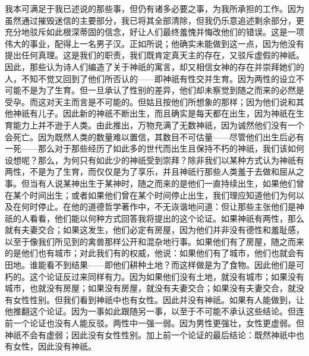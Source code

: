 我本可满足于我已述说的那些事，但仍有诸多必要之事，为我所承担的工作。因为虽然通过摧毁迷信的主要部分，我已将其全部清除，但我仍乐意追述剩余部分，更充分地驳斥如此根深蒂固的信念，好让人们最终羞愧并悔改他们的错误。这是一项伟大的事业，配得上一名男子汉。正如所说；他确实未能做到这一点，因为他没有提出任何真理。这是我们的职责，我们既肯定真天主的存在，又驳斥虚假的神祇。因此，那些认为诗人们编造了关于神祇的寓言，却又相信女神的存在并崇拜她们的人，不知不觉又回到了他们所否认的——即神祇有性交并生育。因为两性的设立不可能不是为了生育。但一旦承认了性别的差异，他们却未察觉到随之而来的必然是受孕。而这对天主而言是不可能的。但姑且按他们所想象的那样；因为他们说和其他神祇有儿子。因此新的神祇不断出生，而且确实是每天都在出生，因为神祇在生育能力上并不逊于人类。由此推出，万物充满了无数神祇，因为诚然他们没有一个会死亡。因为既然人类的数量难以置信，其数目不可估量——尽管他们出生后必有一死——那么对于那些经历了如此多的世代而出生且保持不朽的神祇，我们该如何设想呢？那么，为何只有如此少的神祇受到崇拜？除非我们以某种方式认为神祇有两性，不是为了生育，而仅仅是为了享乐，并且神祇行那些人类羞于去做和屈从之事。但当有人说某神出生于某神时，随之而来的是他们一直持续出生，如果他们曾在某个时间出生；或者如果他们曾在某个时间停止出生，我们理应知道他们为何以及在何时停止。在他的道德哲学著作中，不无诙谐地问道：但让那些主张他们是神祇的人看看，他们能以何种方式回答我将提出的这个论证。如果神祇有两性，那么就有夫妻交合；如果这发生，他们必定有房屋，因为他们并非没有德性和羞耻感，以至于像我们所见到的禽兽那样公开和混杂地行事。如果他们有了房屋，随之而来的是他们也有城市；对此我们有的权威，他说：如果他们有了城市，他们也就会有田地。谁能看不到结果——即他们耕种土地？而这样做是为了食物。因此他们是可朽的。这个论证反过来同样有力。因为如果他们没有土地，就没有城市；如果没有城市，也就没有房屋；如果没有房屋，就没有夫妻交合；如果没有夫妻交合，就没有女性性别。但我们看到神祇中也有女性。因此并没有神祇。如果有人能做到，让他推翻这个论证。因为一事如此跟随另一事，以至于不可能不承认这些结论。但连前一个论证也没有人能反驳。两性中一强一弱。因为男性更强壮，女性更虚弱。但神祇不会有虚弱；因此没有女性性别。加上前一个论证的最后结论：既然神祇中也有女性，因此没有神祇。\par

